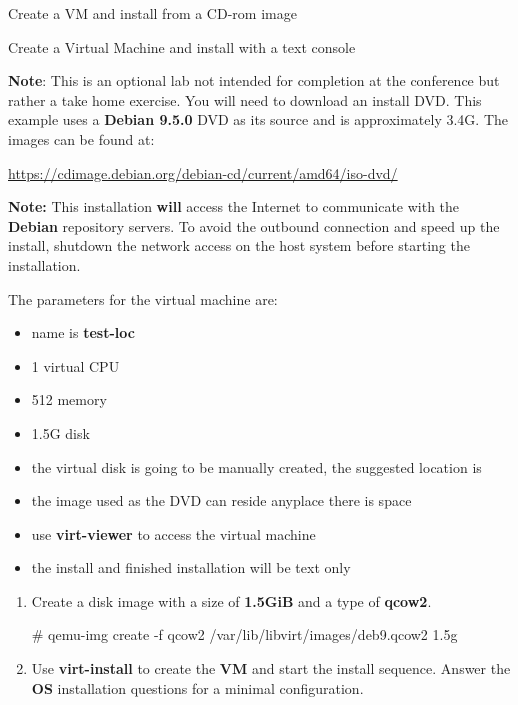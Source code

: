 \begin{Lab}
\begin{exe} {Create a VM and install from a CD-rom image}
\end{exe}


\begin{exe}  {Create a Virtual Machine and install with a text console}
	
	\textbf{Note}: This is an optional lab not intended for completion at the
	conference but rather a take home exercise. You will need to download an install DVD.
	This example uses a \textbf{Debian 9.5.0} DVD as its source and is approximately
	3.4G. The images can be found at:

	\url{https://cdimage.debian.org/debian-cd/current/amd64/iso-dvd/}

	\textbf{Note:} This installation \textbf{will} access the Internet 
	to communicate with the \textbf{Debian} repository servers.
	To avoid the outbound connection and speed up the install,
	shutdown the network access 
	on the host system before starting the installation. 

 The parameters for the virtual machine are:
        \begin{itemize}
                \item name is \textbf{test-loc}
                \item 1 virtual CPU
                \item 512 memory
		\item 1.5G disk 
                \item the virtual disk is going to be manually created, the
			suggested location is 
		\item the image used as the DVD can reside anyplace 
			there is space
                \item use \textbf{virt-viewer} to access the virtual machine
		\item the install and finished installation will be text only
	\end{itemize}

	\begin{sol}
	\begin{enumerate}
		\item Create a disk image with a size of \textbf{1.5GiB} and a 
			type of \textbf{qcow2}. 
			\begin{raw}
# qemu-img create -f qcow2 /var/lib/libvirt/images/deb9.qcow2 1.5g
			\end{raw} 
		\item Use \textbf{virt-install} to create the
			\textbf{VM} and start the install sequence. 
			Answer the \textbf{OS} installation questions for a 
			minimal configuration. 
		\begin{raw}


\end{raw}
\end{enumerate}
\end{sol}
\end{exe}
\end{Lab}
